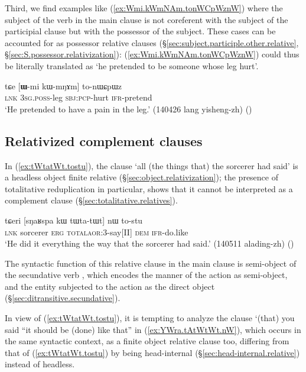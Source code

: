 Third, we find examples like (\ref{ex:Wmi.kWmNAm.tonWCpWznW}) where the subject of the verb in the main clause is not coreferent with the subject of the participial clause but with the possessor of the subject. These cases can be accounted for as possessor relative clauses (§\ref{sec:subject.participle.other.relative}, §\ref{sec:S.possessor.relativization}):  (\ref{ex:Wmi.kWmNAm.tonWCpWznW}) could thus be literally translated as `he pretended to be someone whose leg hurt'.

\begin{exe}
\ex \label{ex:Wmi.kWmNAm.tonWCpWznW}
 \gll  tɕe [\textbf{ɯ}-mi kɯ-mŋɤm] to-nɯɕpɯz  \\
 \textsc{lnk} \textsc{3sg}.\textsc{poss}-leg \textsc{sbj}:\textsc{pcp}-hurt \textsc{ifr}-pretend \\
 \glt `He pretended to have a pain in the leg.' (140426 lang yisheng-zh)
 ()
\end{exe}

 \subsection{Relativized complement clauses}  \label{sec:relativized.complement.clause}
In (\ref{ex:tWtatWt.tostu}),  the clause  `all (the things that) the sorcerer had said' is a headless object finite relative (§\ref{sec:object.relativization}); the presence of totalitative reduplication in particular, shows that it cannot be interpreted as a complement clause (§\ref{sec:totalitative.relatives}).

\begin{exe}
\ex \label{ex:tWtatWt.tostu}
\gll tɕeri [sŋaʁspa kɯ tɯ\redp{}ta-tɯt] nɯ to-stu \\
\textsc{lnk} sorcerer \textsc{erg} \textsc{total}\redp{}\textsc{aor}:3\flobv{}-say[II] \textsc{dem} \textsc{ifr}-do.like \\
\glt `He did it everything the way that the sorcerer had said.' (140511 alading-zh)
()
\end{exe} 

The syntactic function of this relative clause in the main clause is semi-object of the secundative verb , which encodes the manner of the action as semi-object, and the entity subjected to the action as the direct object  (§\ref{sec:ditransitive.secundative}). 

In view of (\ref{ex:tWtatWt.tostu}), it is tempting to analyze the clause  `(that) you said ``it should be (done) like that'' in (\ref{ex:YWra.tAtWtWt.nW}), which occurs in the same syntactic context, as a finite object relative clause too, differing from that of (\ref{ex:tWtatWt.tostu}) by being head-internal (§\ref{sec:head-internal.relative}) instead of headless.

